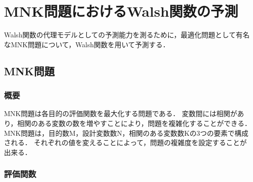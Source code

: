\documentclass[main]{subfiles}
\begin{document}
\chapter{MNK問題におけるWalsh関数の予測}
    Walsh関数の代理モデルとしての予測能力を測るために，最適化問題として有名なMNK問題について，Walsh関数を用いて予測する．
    \section{MNK問題}
        \subsection{概要}
        MNK問題\cite{mnk}は各目的の評価関数を最大化する問題である．
        変数間には相関があり，相関のある変数の数を増やすことにより，問題を複雑化することができる．
        MNK問題は，目的数M，設計変数数N，相関のある変数数Kの3つの要素で構成される．
        それぞれの値を変えることによって，問題の複雑度を設定することが出来る．
        \subsection{評価関数}
    
\end{document}
